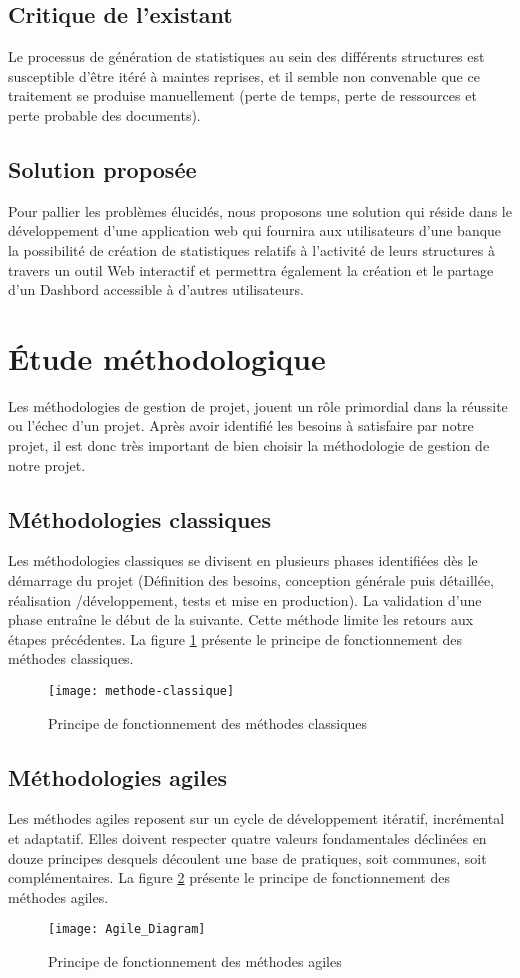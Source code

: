 \subsection{Critique de l’existant}
Le processus de génération de statistiques au sein des différents structures est susceptible d’être itéré à maintes reprises, et il semble non convenable que ce traitement se produise manuellement (perte de temps, perte de ressources et perte probable des documents).
\subsection{Solution proposée}
Pour pallier les problèmes élucidés, nous proposons une solution qui réside dans le développement d’une application web qui fournira aux utilisateurs d’une banque la possibilité de création de statistiques relatifs à l’activité de leurs structures à travers un outil Web interactif et permettra également la création et le partage d’un Dashbord accessible à d’autres utilisateurs.

\section{Étude méthodologique}
Les méthodologies de gestion de projet, jouent un rôle primordial dans la réussite ou l’échec d’un projet. Après avoir identifié les besoins à satisfaire par notre projet, il est donc très important de bien choisir la méthodologie de gestion de notre projet.

\subsection{Méthodologies classiques}
Les méthodologies classiques se divisent en plusieurs phases identifiées dès le démarrage du projet (Définition des besoins, conception générale puis détaillée, réalisation /développement, tests et mise en production). La validation d’une phase entraîne le début de la suivante. Cette méthode limite les retours aux étapes précédentes. La figure \ref{fig:mc} \cite{Mclassiques} présente le principe de fonctionnement des méthodes classiques.
\begin{figure}[htpb]
\centering
    \texttt{[image: methode-classique]}
    \caption{Principe de fonctionnement des méthodes classiques}
    \label{fig:mc}
\end{figure}
\newpage
\subsection{Méthodologies agiles}
Les méthodes agiles reposent sur un cycle de développement itératif, incrémental et adaptatif. Elles doivent respecter quatre valeurs fondamentales déclinées en douze principes desquels découlent une base de pratiques, soit communes, soit complémentaires. La figure \ref{fig:ma} \cite{Magiles} présente le principe de fonctionnement des méthodes agiles.
\begin{figure}[htpb]
\centering
\texttt{[image: Agile\_Diagram]}
\caption{Principe de fonctionnement des méthodes agiles} 
\label{fig:ma}
\end{figure}
